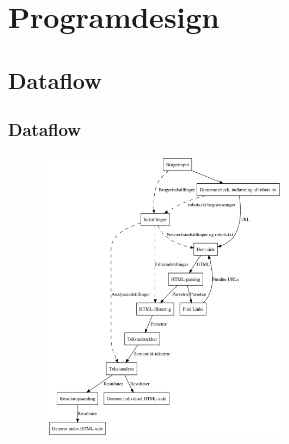 \documentclass{beamer}
\begin{document}
\section{Programdesign}
\subsection{Dataflow}
\begin{frame}
  \frametitle{Dataflow}
  \begin{figure}
    \includegraphics[width=0.55\textwidth]{endeligtdesignill.pdf}
  \end{figure}
\end{frame}
\end{document}

